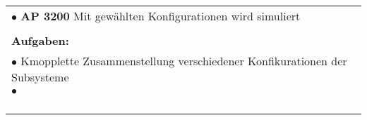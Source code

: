 \begin{table}[!h]
\begin{center}
\begin{tabular}{|p{35mm}||p{55mm}|p{50mm}||p{40mm}|}
   \multicolumn{4}{|p{150mm}|}{$\bullet$ \textbf{AP 3200} Mit gewählten Konfigurationen wird simuliert}\\
   \multicolumn{4}{|p{150mm}|}{}\\
   \multicolumn{4}{|p{150mm}|}{\textbf{Aufgaben:}}\\
   \multicolumn{4}{|p{150mm}|}{$\bullet$ Kmopplette Zusammenstellung verschiedener Konfikurationen der Subsysteme}\\
   \multicolumn{4}{|p{150mm}|}{$\bullet$}\\
   \multicolumn{4}{|p{150mm}|}{}\\
   \multicolumn{4}{|p{150mm}|}{\textbf{}}\\
   \multicolumn{4}{|p{150mm}|}{}\\
   \multicolumn{4}{|p{150mm}|}{}\\
   \hline
  \end{tabular}
 \end{center}
\end{table}


